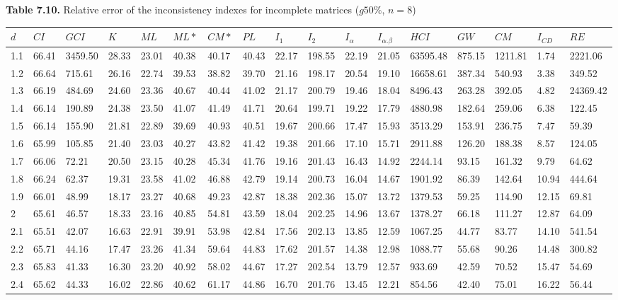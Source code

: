 \newpage
\textbf{Table 7.10.} Relative error of the inconsistency indexes for incomplete matrices ($g50\%$, $n=8$)
\begin{adjustbox}{angle=90}
  \begin{center}
    \small{    
    \begin{tabular}{|l|llllllllllllllll|}
      \hline $d$ &
$CI$&$	\textit{GCI}$&$K$&$ML$&$ML*$&$CM*$&$PL$&$I_1$&$I_2$&$I_{\alpha}$&$I_{\alpha.\beta}$&$HCI$&$GW$&$CM$&$I_{CD}$&$RE$\\ \hline \hline
1.1&66.41&3459.50&28.33&23.01&40.38&40.17&40.43&22.17&198.55&22.19&21.05&63595.48&875.15&1211.81&1.74&2221.06  \\ 
1.2&66.64&715.61&26.16&22.74&39.53&38.82&39.70&21.16&198.17&20.54&19.10&16658.61&387.34&540.93&3.38&349.52  \\ 
1.3&66.19&484.69&24.60&23.36&40.67&40.44&41.02&21.17&200.79&19.46&18.04&8496.43&263.28&392.05&4.82&24369.42  \\ 
1.4&66.14&190.89&24.38&23.50&41.07&41.49&41.71&20.64&199.71&19.22&17.79&4880.98&182.64&259.06&6.38&122.45  \\ 
1.5&66.14&155.90&21.81&22.89&39.69&40.93&40.51&19.67&200.66&17.47&15.93&3513.29&153.91&236.75&7.47&59.39  \\ 
1.6&65.99&105.85&21.40&23.03&40.27&43.82&41.42&19.38&201.66&17.10&15.71&2911.88&126.20&188.38&8.57&124.05  \\ 
1.7&66.06&72.21&20.50&23.15&40.28&45.34&41.76&19.16&201.43&16.43&14.92&2244.14&93.15&161.32&9.79&64.62  \\ 
1.8&66.24&62.37&19.31&23.58&41.02&46.88&42.79&19.14&200.73&16.04&14.67&1901.92&86.39&142.64&10.94&444.64  \\ 
1.9&66.01&48.99&18.17&23.27&40.68&49.23&42.87&18.38&202.36&15.07&13.72&1379.53&59.25&114.90&12.15&69.81  \\ 
2&65.61&46.57&18.33&23.16&40.85&54.81&43.59&18.04&202.25&14.96&13.67&1378.27&66.18&111.27&12.87&64.09  \\ 
2.1&65.51&42.07&16.63&22.91&39.91&53.98&42.84&17.56&202.13&13.85&12.59&1067.25&44.77&83.77&14.10&541.54  \\ 
2.2&65.71&44.16&17.47&23.26&41.34&59.64&44.83&17.62&201.57&14.38&12.98&1088.77&55.68&90.26&14.48&300.82  \\ 
2.3&65.83&41.33&16.30&23.20&40.92&58.02&44.67&17.27&202.54&13.79&12.57&933.69&42.59&70.52&15.47&54.69  \\ 
2.4&65.62&44.33&16.02&22.86&40.62&61.17&44.86&16.70&201.76&13.45&12.21&854.56&42.40&75.01&16.22&56.44  \\ 

\end{tabular}}
\end{center}
\end{adjustbox}
